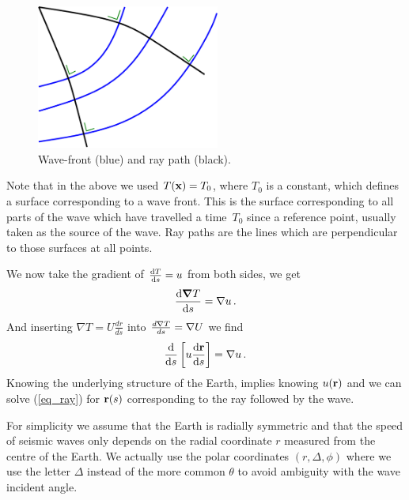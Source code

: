 \documentclass{mm2}
\newcommand{\bnabla}{\boldsymbol{\nabla}}
\begin{document}
\begin{figure}[ht]
    \centering
  \includegraphics[width=6cm]{figures/RayPath.eps}
\caption{Wave-front (blue) and ray path (black).
}
\label{fig:raypath}
\end{figure}



Note that in the above we used $T({\bf x})=T_0$, where $T_0$ is a
constant, which defines a surface corresponding to a wave front.  This is
the surface corresponding to all parts of the wave which have
travelled a time~$T_0$ since a reference point, usually taken as the
source of the wave.  Ray paths are the lines which are perpendicular
to those surfaces at all points.



We now take the gradient of $\frac{{\rm d}T}{{\rm d}s}=u$ from both sides, we get
\begin{eqnarray}
\frac{{\rm d}\bnabla{T}}{{\rm d}s}=\nabla u\,.
\label{eq_gradv}
\end{eqnarray}
And inserting $\nabla T = U \frac{dr}{ds}$ into $\frac{d{\bf \nabla}T}{ds} = {\bf \nabla} U$ we find
\begin{eqnarray}
\frac{{\rm d}}{{\rm d}s}\left[u \frac{{\rm d} {\bf r}}{{\rm d}s}\right]=\nabla u\,.
\label{eq_ray}
\end{eqnarray}
Knowing the underlying structure of the Earth, implies knowing $u({\bf r})$ and
we can solve (\ref{eq_ray}) for ${\bf r}(s)$ corresponding to the ray followed 
by the wave.

For simplicity we assume that the Earth is radially symmetric and that the 
speed of seismic waves only depends on the radial coordinate $r$ measured from
the centre of the Earth. We actually use the polar coordinates
$(r,\Delta,\phi)$ where we use the letter $\Delta$ instead of the more
common $\theta$ to avoid ambiguity with the wave incident angle. 
\end{document}
